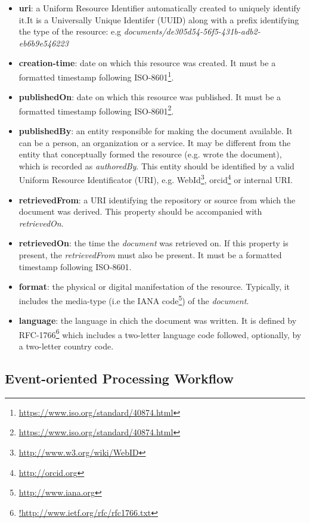 \begin{itemize}
\item \textbf{uri}: a Uniform Resource Identifier automatically created to uniquely identify it.It is a Universally Unique Identifer (UUID) along with a prefix identifying the type of the resource: e.g \textit{documents/de305d54-56f5-431b-adb2-eb6b9e546223}
\item \textbf{creation-time}: date on which this resource was created. It must be a formatted timestamp following ISO-8601\footnote{\url{https://www.iso.org/standard/40874.html}}.
\item \textbf{publishedOn}: date on which this resource was published. It must be a formatted timestamp following ISO-8601\footnote{\url{https://www.iso.org/standard/40874.html}}.
\item \textbf{publishedBy}: an entity responsible for making the document available. It can be a  person, an  organization or a service. It may be different from the entity that conceptually formed the resource (e.g. wrote the document), which is recorded as \textit{authoredBy}. This entity should be identified by a valid Uniform Resource  Identificator (URI), e.g. WebId\footnote{\url{http://www.w3.org/wiki/WebID}}, orcid\footnote{\url{http://orcid.org}} or internal URI. 
\item \textbf{retrievedFrom}: a URI identifying the repository or source from which the document was derived. This property should be accompanied with \textit{retrievedOn}.
\item \textbf{retrievedOn}: the time the \textit{document} was retrieved on. If this property is present, the \textit{retrievedFrom} must also be present. It must be a formatted timestamp following ISO-8601.
\item \textbf{format}: the physical or digital manifestation of the resource. Typically, it includes the media-type (i.e the IANA code\footnote{\url{http://www.iana.org}}) of the \textit{document}.
\item \textbf{language}: the language in chich the document was written. It is defined by RFC-1766\footnote{\url{ !http://www.ietf.org/rfc/rfc1766.txt}} which includes a two-letter language code followed, optionally, by a two-letter country code.
\end{itemize}

\subsection{Event-oriented Processing Workflow}

